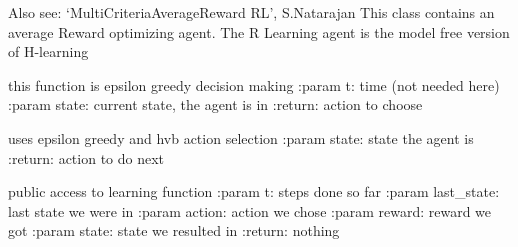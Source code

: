 \documentclass[letterpaper,10pt,english]{sphinxmanual}
\begin{document}
\begin{fulllineitems}
\label{Agents:morl_agents.MORLRLearningAgent}
Also see: `MultiCriteriaAverageReward RL', S.Natarajan
This class contains an average Reward optimizing agent.
The R Learning agent is the model free version of H-learning

\begin{fulllineitems}
\label{Agents:morl_agents.MORLRLearningAgent.decide}
this function is epsilon greedy decision making
:param t: time (not needed here)
:param state: current state, the agent is in
:return: action to choose

\end{fulllineitems}


\begin{fulllineitems}
\label{Agents:morl_agents.MORLRLearningAgent.get_learned_action}
uses epsilon greedy and hvb action selection
:param state: state the agent is
:return: action to do next

\end{fulllineitems}


\begin{fulllineitems}
\label{Agents:morl_agents.MORLRLearningAgent.learn}
public access to learning function
:param t: steps done so far
:param last\_state: last state we were in
:param action: action we chose
:param reward: reward we got
:param state: state we resulted in
:return: nothing

\end{fulllineitems}


\end{fulllineitems}

\end{document}
